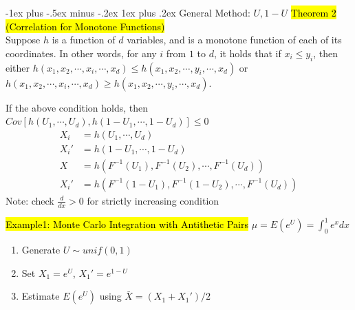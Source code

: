 \documentclass[a4paper,12pt,landscape]{article}
\makeatletter
\renewcommand{\subsubsection}{\@startsection{subsubsection}{3}{0mm}%
                                {-1ex plus -.5ex minus -.2ex}%
                                {1ex plus .2ex}%
                                {\normalfont\small\bfseries\color{violet}}}
\makeatother
\begin{document}
\begin{multicols}{3}
    \subsubsection{General Method: $U, 1-U$}
    \hl{Theorem 2 (Correlation for Monotone Functions)}\\
    Suppose $h$ is a function of $d$ variables, and is a monotone function of each of its coordinates. In other words, for any $i$ from $1$ to $d$, it holds that if $x_i\leq y_i$, then either $h(x_1, x_2, \cdots, x_i, \cdots, x_d)\leq h(x_1, x_2, \cdots, y_i, \cdots, x_d)$ or $h(x_1, x_2, \cdots, x_i, \cdots, x_d) \geq h(x_1, x_2, \cdots, y_i, \cdots, x_d)$.

    If the above condition holds, then $Cov[h(U_1, \cdots, U_d), h(1-U_1, \cdots, 1-U_d)]\leq0$
    \begin{align*}
        X_i &= h(U_1, \cdots, U_d)\\
        X_i' &= h(1-U_1, \cdots, 1-U_d)\\
        X &= h(F^{-1}(U_1), F^{-1}(U_2), \cdots, F^{-1}(U_d))\\
        X_i' &= h(F^{-1}(1-U_1), F^{-1}(1-U_2), \cdots, F^{-1}(U_d))
    \end{align*}
    Note: check $\frac{d}{dx}>0$ for strictly increasing condition

    \hl{Example1: Monte Carlo Integration with Antithetic Pairs}
    $\mu = E(e^U)=\int_0^1e^x dx$
    \begin{enumerate}
        \item Generate $U\sim unif(0,1)$
        \item Set $X_1 = e^U$, $X_1' = e^{1-U}$
        \item Estimate $E(e^U)$ using $\bar X = (X_1+X_1')/2$
    \end{enumerate}


\end{multicols}
\end{document}
